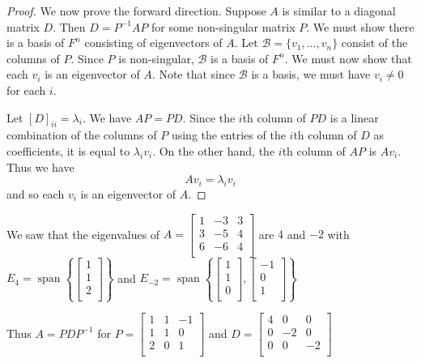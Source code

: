 \documentclass{article}
\DeclareMathOperator{\spn}{span}
\begin{document}
\begin{proof}
      We now prove the forward direction. Suppose $A$ is similar to a diagonal matrix $D$. Then $D = P^{-1}AP$ for some non-singular matrix $P$. We must show there is a basis of $F^n$ consisting of eigenvectors of $A$. Let $\mathcal{B} = \{v_1, \ldots, v_n\}$ consist of the columns of $P$. Since $P$ is non-singular, $\mathcal{B}$ is a basis of $F^n$. We must now show that each $v_i$ is an eigenvector of $A$. Note that since $\mathcal{B}$ is a basis, we must have $v_i \neq 0$ for each $i$.

      Let $[D]_{ii} = \lambda_i$. We have $AP = PD$. Since the $i$th column of $PD$ is a linear combination of the columns of $P$ using the entries of the $i$th column of $D$ as coefficients, it is equal to $\lambda_iv_i$. On the other hand, the $i$th column of $AP$ is $Av_i$. Thus we have \[
        Av_i = \lambda_iv_i
      \] and so each $v_i$ is an eigenvector of $A$.
    \end{proof}
    \begin{example}
      We saw that the eigenvalues of $A =
      \begin{bmatrix}
        1 & -3 & 3\\
        3 & -5 & 4\\
        6 & -6 & 4\\
      \end{bmatrix}$ are $4$ and $-2$ with $E_4 = \spn \left\{
        \begin{bmatrix}
          1\\1\\2\\
      \end{bmatrix}\right\}$ and $E_{-2} = \spn \left\{
        \begin{bmatrix}
          1\\1\\0\\
        \end{bmatrix},
        \begin{bmatrix}
          -1\\0\\1\\
      \end{bmatrix}\right\}$

      Thus $A = PDP^{-1}$ for $P =
      \begin{bmatrix}
        1 & 1 & -1\\
        1 & 1 & 0\\
        2 & 0 & 1\\
      \end{bmatrix}$ and $D =
      \begin{bmatrix}
        4 & 0 & 0\\
        0 & -2 & 0\\
        0 & 0 & -2\\
      \end{bmatrix}$
    \end{example}
\end{document}
